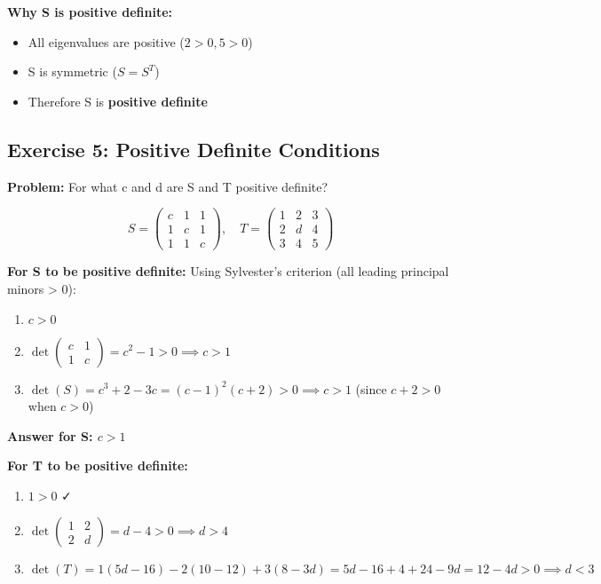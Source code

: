 \documentclass[12pt,a4paper]{article}
\begin{document}
\textbf{Why S is positive definite:}
\begin{itemize}
    \item All eigenvalues are positive ($2 > 0, 5 > 0$)
    \item S is symmetric ($S = S^T$)
    \item Therefore S is \textbf{positive definite}
\end{itemize}

\subsection{Exercise 5: Positive Definite Conditions}

\textbf{Problem:} For what c and d are S and T positive definite?

$$S = \begin{pmatrix} c & 1 & 1 \\ 1 & c & 1 \\ 1 & 1 & c \end{pmatrix}, \quad T = \begin{pmatrix} 1 & 2 & 3 \\ 2 & d & 4 \\ 3 & 4 & 5 \end{pmatrix}$$

\textbf{For S to be positive definite:}
Using Sylvester's criterion (all leading principal minors > 0):

\begin{enumerate}
    \item $c > 0$
    \item $\det\begin{pmatrix} c & 1 \\ 1 & c \end{pmatrix} = c^2 - 1 > 0 \implies c > 1$
    \item $\det(S) = c^3 + 2 - 3c = (c-1)^2(c+2) > 0 \implies c > 1$ (since $c+2 > 0$ when $c > 0$)
\end{enumerate}

\textbf{Answer for S: $c > 1$}

\textbf{For T to be positive definite:}
\begin{enumerate}
    \item $1 > 0$ ✓
    \item $\det\begin{pmatrix} 1 & 2 \\ 2 & d \end{pmatrix} = d - 4 > 0 \implies d > 4$
    \item $\det(T) = 1(5d - 16) - 2(10 - 12) + 3(8 - 3d) = 5d - 16 + 4 + 24 - 9d = 12 - 4d > 0 \implies d < 3$
\end{enumerate}
\end{document}
